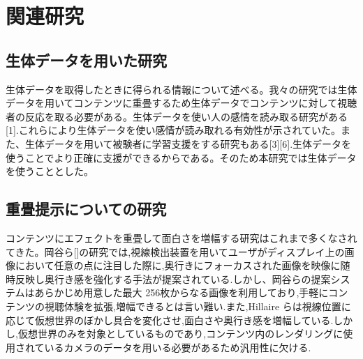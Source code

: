\thispagestyle{myheadings}
\chapter{関連研究}


\section{生体データを用いた研究}
生体データを取得したときに得られる情報について述べる。我々の研究では生体データを用いてコンテンツに重畳するため生体データでコンテンツに対して視聴者の反応を取る必要がある。生体データを使い人の感情を読み取る研究がある[1].これらにより生体データを使い感情が読み取れる有効性が示されていた。また、生体データを用いて被験者に学習支援をする研究もある[3][6].生体データを使うことでより正確に支援ができるからである。そのため本研究では生体データを使うこととした。


\section{重畳提示についての研究}
コンテンツにエフェクトを重畳して面白さを増幅する研究はこれまで多くなされてきた。岡谷ら[]の研究では,視線検出装置を用いてユーザがディスプレイ上の画像において任意の点に注目した際に,奥行きにフォーカスされた画像を映像に随時反映し奥行き感を強化する手法が提案されている.しかし、岡谷らの提案システムはあらかじめ用意した最大 256枚からなる画像を利用しており,手軽にコンテンツの視聴体験を拡張,増幅できるとは言い難い.また,Hillaire らは視線位置に応じて仮想世界のぼかし具合を変化させ,面白さや奥行き感を増幅している.しかし,仮想世界のみを対象としているものであり,コンテンツ内のレンダリングに使用されているカメラのデータを用いる必要があるため汎用性に欠ける.


